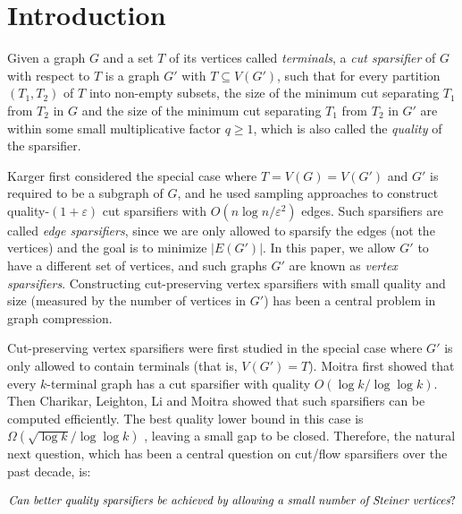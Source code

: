 \documentclass[11pt]{article}
\theoremstyle{definition}
\begin{document}
\renewcommand{\baselinestretch}{0.75}\normalsize
\tableofcontents
\renewcommand{\baselinestretch}{1.0}\normalsize


\newpage

\section{Introduction}

Given a graph $G$ and a set $T$ of its vertices called \emph{terminals}, a \emph{cut sparsifier} of $G$ with respect to $T$ is a graph $G'$ with $T\subseteq V(G')$, such that for every partition $(T_1,T_2)$ of $T$ into non-empty subsets, the size of the minimum cut separating $T_1$ from $T_2$ in $G$ and the size of the minimum cut separating $T_1$ from $T_2$ in $G'$ are within some small multiplicative factor $q\ge 1$, which is also called the \emph{quality} of the sparsifier.


Karger \cite{karger1993global,karger1999random} first considered the special case where $T=V(G)=V(G')$ and $G'$ is required to be a subgraph of $G$, and
he used sampling approaches to construct quality-$(1+\varepsilon)$ cut sparsifiers with $O(n\log n/\varepsilon^2)$ edges.
Such sparsifiers are called \emph{edge sparsifiers}, since we are only allowed to sparsify the edges (not the vertices) and the goal is to minimize $|E(G')|$.
In this paper, we allow $G'$ to have a different set of vertices, and such graphs $G'$ are known as \emph{vertex sparsifiers}.
Constructing cut-preserving vertex sparsifiers with small quality and size (measured by the number of vertices in $G'$) has been a central problem in graph compression.

Cut-preserving vertex sparsifiers were first studied in the special case where $G'$ is only allowed to contain terminals (that is, $V(G')=T$). Moitra \cite{moitra2009approximation} first showed that every  $k$-terminal graph has a cut sparsifier with quality $O(\log k/\log\log k)$.
Then Charikar, Leighton, Li and Moitra \cite{charikar2010vertex} showed that such sparsifiers can be computed efficiently.
The best quality lower bound in this case is $\Omega(\sqrt{\log k}/\log\log k)$ \cite{makarychev2010metric,charikar2010vertex}, leaving a small gap to be closed. 
Therefore, the natural next question, which has been a central question on cut/flow sparsifiers over the past decade, is:

\vspace{-10pt}
\[\emph{Can better quality sparsifiers be achieved by allowing a small number of Steiner vertices}? 
\]
\vspace{-10pt}
\end{document}
